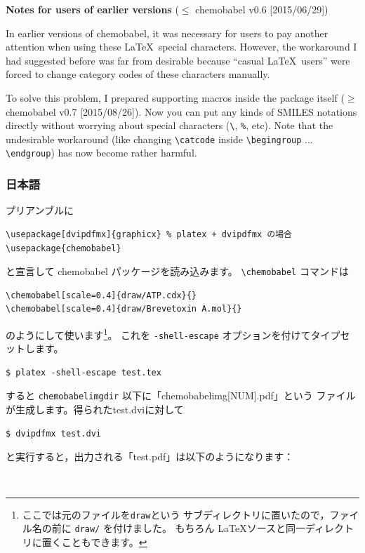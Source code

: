 \documentclass[12pt]{ltjsarticle}
\begin{document}
\noindent \textbf{Notes for users of earlier versions} ($\le$ \textsf{chemobabel} v0.6 [2015/06/29])

In earlier versions of \textsf{chemobabel}, it was necessary for users
to pay another attention when using these \LaTeX\ special characters.
However, the workaround I had suggested before was far from desirable
because ``casual \LaTeX\ users'' were forced to change category codes
of these characters manually.

To solve this problem, I prepared supporting macros inside the package
itself ($\ge$ \textsf{chemobabel} v0.7 [2015/08/26]).
Now you can put any kinds of SMILES notations directly without worrying
about special characters (\verb|\|, \verb|%|, etc).
Note that the undesirable workaround (like changing \verb|\catcode| inside
\verb|\begingroup| ... \verb|\endgroup|) has now become rather harmful.

\clearpage

\subsubsection{日本語}

プリアンブルに
\begin{verbatim}
\usepackage[dvipdfmx]{graphicx} % platex + dvipdfmx の場合
\usepackage{chemobabel}
\end{verbatim}
と宣言して \textsf{chemobabel} パッケージを読み込みます。
\verb|\chemobabel| コマンドは
\begin{verbatim}
\chemobabel[scale=0.4]{draw/ATP.cdx}{}
\chemobabel[scale=0.4]{draw/Brevetoxin A.mol}{}
\end{verbatim}
のようにして使います\footnote{ここでは元のファイルを\texttt{draw}という
サブディレクトリに置いたので，ファイル名の前に \texttt{draw/} を付けました。
もちろん \LaTeX ソースと同一ディレクトリに置くこともできます。}。
これを \verb|-shell-escape| オプションを付けてタイプセットします。
\begin{verbatim}
$ platex -shell-escape test.tex
\end{verbatim}
すると \verb|chemobabelimgdir| 以下に「chemobabelimg[NUM].pdf」という
ファイルが生成します。得られたtest.dviに対して
\begin{verbatim}
$ dvipdfmx test.dvi
\end{verbatim}
と実行すると，出力される「test.pdf」は以下のようになります：
\begin{figure}[h]
  \centering
   \\
\end{figure}
\end{document}
